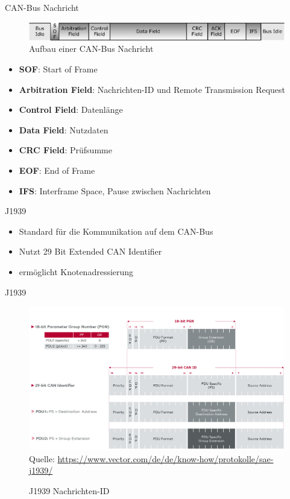 \documentclass[usenames, dvipsnames, aspectratio=75]{beamer}
\begin{document}
\begin{frame}{CAN-Bus Nachricht}
    \begin{figure}
        \centering
        \includegraphics[width=0.9\linewidth]{assets/canMessage.png}
        \caption{Aufbau einer CAN-Bus Nachricht}
    \end{figure}
    \begin{itemize}
        \item \textbf{SOF}: Start of Frame
        \item \textbf{Arbitration Field}: Nachrichten-ID und Remote Transmission Request
        \item \textbf{Control Field}: Datenlänge
        \item \textbf{Data Field}: Nutzdaten
        \item \textbf{CRC Field}: Prüfsumme
        \item \textbf{EOF}: End of Frame
        \item \textbf{IFS}: Interframe Space, Pause zwischen Nachrichten
    \end{itemize}
\end{frame}

\begin{frame}{J1939}
    \begin{itemize}
        \item Standard für die Kommunikation auf dem CAN-Bus
        \item Nutzt 29 Bit Extended CAN Identifier
        \item ermöglicht Knotenadressierung
    \end{itemize}
\end{frame}

\begin{frame}{J1939}
    \begin{figure}
        \centering
        \includegraphics[width=1\linewidth]{assets/j1939id.png}
        \tiny{Quelle: \url{https://www.vector.com/de/de/know-how/protokolle/sae-j1939/}}
        \caption{J1939 Nachrichten-ID}
    \end{figure}
\end{frame}
\end{document}
